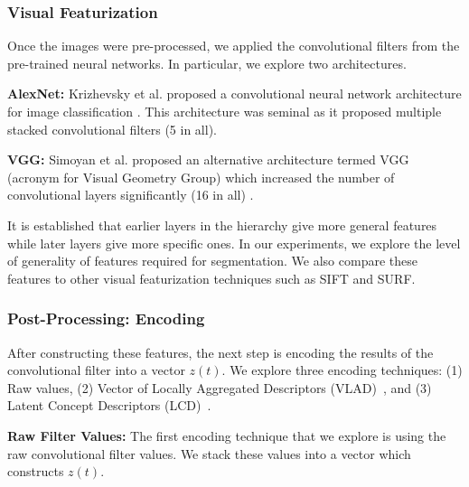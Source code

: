 \documentclass[0-main.tex]{subfiles}
\begin{document}
\subsubsection{Visual Featurization}
Once the images were pre-processed, we applied the convolutional filters from the pre-trained neural networks. In particular, we explore two architectures.

\vspace{0.25em}
\noindent\textbf{AlexNet: } Krizhevsky et al. proposed a convolutional neural network architecture for image classification \cite{krizhevsky2012imagenet}. This architecture was seminal as it proposed multiple stacked convolutional filters (5 in all).   

\vspace{0.25em}
\noindent\textbf{VGG: } Simoyan et al. proposed an alternative architecture termed VGG (acronym for Visual Geometry Group) which increased the number of convolutional layers significantly (16 in all) \cite{simonyan2014very}.

\vspace{0.25em}

It is established that earlier layers in the hierarchy give more general features while later layers give more specific ones.
In our experiments, we explore the level of generality of features required for segmentation. 
We also compare these features to other visual featurization techniques such as SIFT and SURF.

\subsubsection{Post-Processing: Encoding}
After constructing these features, the next step is encoding the results of the convolutional filter into a vector $z(t)$.
We explore three encoding techniques: (1) Raw values, (2) Vector of Locally Aggregated Descriptors (VLAD)~\cite{arandjelovic2013all}, and (3) Latent Concept Descriptors (LCD)~\cite{xu2014discriminative}.

\iffalse
\vspace{0.25em}
\noindent\textbf{Raw Filter Values: } The first encoding technique that we explore is using the raw convolutional filter values. We stack these values into a vector which constructs $z(t)$.
\end{document}
